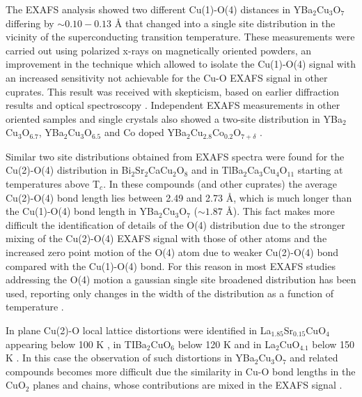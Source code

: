 The EXAFS analysis showed two different Cu(1)-O(4) distances in YBa$_2$Cu$_3$O$_7$ differing by $\sim 0.10-0.13$ \AA \cite{Conradson1990,MustredeLeon1992a} that changed into a single site distribution in the vicinity of the superconducting transition temperature. 
These measurements were carried out using polarized x-rays on magnetically oriented powders, an improvement in the technique which allowed to isolate the Cu(1)-O(4) signal with an increased sensitivity not achievable for the Cu-O EXAFS signal in other cuprates. 
This result was received with skepticism, based on earlier diffraction results \cite{battlog1992lattice,Kwei1990,Sharma1991} and optical spectroscopy \cite{Thomsen1993}. 
Independent EXAFS measurements in other oriented samples \cite{Stern1993} and single crystals \cite{Booth1996} also showed a two-site distribution in YBa$_{2}$Cu$_{3}$O$_{6.7}$, YBa$_{2}$Cu$_{3}$O$_{6.5}$ and Co doped  YBa$_2$Cu$_{2.8}$Co$_{0.2}$O$_{7+\delta}$ \cite{MustredeLeon1991}. 

Similar two site distributions obtained from EXAFS spectra were found for the Cu(2)-O(4) distribution in Bi$_{2}$Sr$_{2}$CaCu$_{2}$O$_{8}$ \cite{bianconni1992lattice} and in TlBa$_{2}$Ca$_{3}$Cu$_{4}$O$_{11}$ \cite{Allen1991} starting at temperatures above T$_{c}$. 
In these compounds (and other cuprates) the average Cu(2)-O(4) bond length lies between 2.49 and 2.73 \AA, which is much longer than the Cu(1)-O(4) bond length in YBa$_{2}$Cu$_{3}$O$_{7}$ ($\sim 1.87$ \AA). 
This fact makes more difficult the identification of details of the O(4) distribution due to the stronger mixing of the Cu(2)-O(4) EXAFS signal with those of other atoms and the increased zero point motion of the O(4) atom due to weaker Cu(2)-O(4) bond compared with the Cu(1)-O(4) bond.
For this reason in most EXAFS studies addressing the O(4) motion a gaussian single site broadened distribution has been used, reporting only changes in the width of the distribution as a function of temperature \cite{Booth1995,Oyanagi2007,Zhang2009}.

In plane Cu(2)-O local lattice distortions were identified in La$_{1.85}$Sr$_{0.15}$CuO$_{4}$ appearing below 100 K \cite{Bianconi1996,Oyanagi2007}, in TIBa$_{2}$CuO$_{6}$ below 120 K \cite{Conradson1997} and in La$_{2}$CuO$_{4.1}$ below 150 K \cite{Lanzara1997,MustredeLeon:xj5003}. 
In this case the observation of such distortions in YBa$_{2}$Cu$_{3}$O$_{7}$ and related compounds becomes more difficult due the similarity in Cu-O bond lengths in the CuO$_2$ planes and chains, whose contributions are mixed in the EXAFS signal \cite{Conradson1997,MustredeLeon1992a}.

